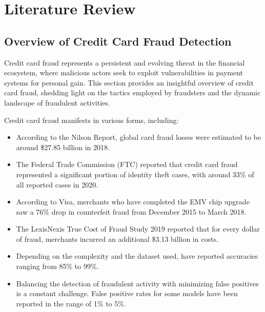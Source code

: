 \let\cleardoublepage\clearpage
\chapter{Literature Review} %

\label{Chapter2} %


\newcommand{\keyword}[1]{\textbf{#1}}
\newcommand{\tabhead}[1]{\textbf{#1}}
\newcommand{\code}[1]{\texttt{#1}}
\newcommand{\file}[1]{\texttt{\bfseries#1}}
\newcommand{\option}[1]{\texttt{\itshape#1}}

\section{Overview of Credit Card Fraud Detection}

Credit card fraud represents a persistent and evolving threat in the financial ecosystem, where malicious actors seek to exploit vulnerabilities in payment systems for personal gain. This section provides an insightful overview of credit card fraud, shedding light on the tactics employed by fraudsters and the dynamic landscape of fraudulent activities.



Credit card fraud manifests in various forms, including:\medskip 
\begin{itemize}
    \item According to the Nilson Report, global card fraud losses were estimated to be around \$27.85 billion in 2018.\medskip 

    \item  The Federal Trade Commission (FTC) reported that credit card fraud represented a significant portion of identity theft cases, with around 33\% of all reported cases in 2020.\medskip 

    \item According to Visa, merchants who have completed the EMV chip upgrade saw a 76\% drop in counterfeit fraud from December 2015 to March 2018.\medskip 

    
    
    \item  The LexisNexis True Cost of Fraud Study 2019 reported that for every dollar of fraud, merchants incurred an additional \$3.13 billion in costs.\medskip

    \item  Depending on the complexity and the dataset used, have reported accuracies ranging from 85\% to 99\%.\medskip

    \item  Balancing the detection of fraudulent activity with minimizing false positives is a constant challenge. False positive rates for some models have been reported in the range of 1\% to 5\%.\medskip
\end{itemize}


